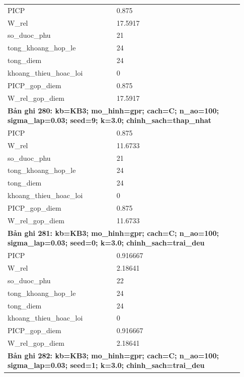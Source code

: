 \begin{longtable}{p{0.43\linewidth}p{0.50\linewidth}}
PICP & 0.875 \\
W\_\allowbreak rel & 17.5917 \\
so\_\allowbreak duoc\_\allowbreak phu & 21 \\
tong\_\allowbreak khoang\_\allowbreak hop\_\allowbreak le & 24 \\
tong\_\allowbreak diem & 24 \\
khoang\_\allowbreak thieu\_\allowbreak hoac\_\allowbreak loi & 0 \\
PICP\_\allowbreak gop\_\allowbreak diem & 0.875 \\
W\_\allowbreak rel\_\allowbreak gop\_\allowbreak diem & 17.5917 \\
\midrule
\multicolumn{2}{p{0.95\linewidth}}{\textbf{Bản ghi 280: kb=KB3; mo\_hinh=gpr; cach=C; n\_ao=100; sigma\_lap=0.03; seed=9; k=3.0; chinh\_sach=thap\_nhat}} \\
PICP & 0.875 \\
W\_\allowbreak rel & 11.6733 \\
so\_\allowbreak duoc\_\allowbreak phu & 21 \\
tong\_\allowbreak khoang\_\allowbreak hop\_\allowbreak le & 24 \\
tong\_\allowbreak diem & 24 \\
khoang\_\allowbreak thieu\_\allowbreak hoac\_\allowbreak loi & 0 \\
PICP\_\allowbreak gop\_\allowbreak diem & 0.875 \\
W\_\allowbreak rel\_\allowbreak gop\_\allowbreak diem & 11.6733 \\
\midrule
\multicolumn{2}{p{0.95\linewidth}}{\textbf{Bản ghi 281: kb=KB3; mo\_hinh=gpr; cach=C; n\_ao=100; sigma\_lap=0.03; seed=0; k=3.0; chinh\_sach=trai\_deu}} \\
PICP & 0.916667 \\
W\_\allowbreak rel & 2.18641 \\
so\_\allowbreak duoc\_\allowbreak phu & 22 \\
tong\_\allowbreak khoang\_\allowbreak hop\_\allowbreak le & 24 \\
tong\_\allowbreak diem & 24 \\
khoang\_\allowbreak thieu\_\allowbreak hoac\_\allowbreak loi & 0 \\
PICP\_\allowbreak gop\_\allowbreak diem & 0.916667 \\
W\_\allowbreak rel\_\allowbreak gop\_\allowbreak diem & 2.18641 \\
\midrule
\multicolumn{2}{p{0.95\linewidth}}{\textbf{Bản ghi 282: kb=KB3; mo\_hinh=gpr; cach=C; n\_ao=100; sigma\_lap=0.03; seed=1; k=3.0; chinh\_sach=trai\_deu}} \\

\end{longtable}
